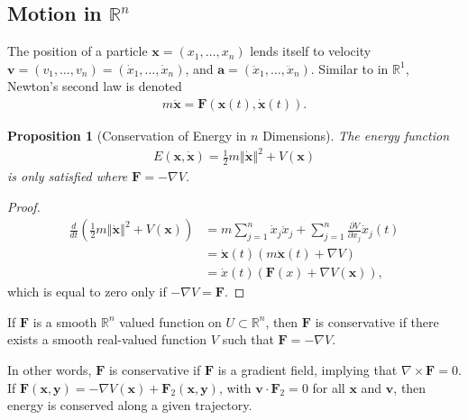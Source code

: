 \documentclass[12pt]{extarticle}
\newcommand{\R}{\mathbb{R}}
\newcommand{\norm}[1]{\left\Vert #1\right\Vert}
\theoremstyle{plain}
\newtheorem*{proposition}{Proposition}%
\theoremstyle{definition}
\theoremstyle{remark}
\renewcommand{\newline}{\hfill\break}
\begin{document}
  \subsection{Motion in $\R^n$}%
  The position of a particle $\mathbf{x} = (x_1,\dots,x_n)$ lends itself to velocity $\mathbf{v} = (v_1,\dots,v_n) = (\dot{x}_1,\dots,\dot{x}_n)$, and $\mathbf{a} = (\ddot{x}_1,\dots,\ddot{x}_n)$. Similar to in $\R^1$, Newton's second law is denoted
  \begin{align*}
    m\mathbf{\ddot{x}} = \mathbf{F}(\mathbf{x}(t),\mathbf{\dot{x}}(t)).
  \end{align*}
  \begin{proposition}[Conservation of Energy in $n$ Dimensions]
    The energy function
    \begin{align*}
      E(\mathbf{x},\mathbf{\dot{x}}) = \frac{1}{2}m\norm{\mathbf{\dot{x}}}^2 + V(\mathbf{x})
    \end{align*}
    is only satisfied where $\mathbf{F} = -\nabla V$.
  \end{proposition}
  \begin{proof}
      \begin{align*}
        \frac{d}{dt}\left(\frac{1}{2}m\norm{\mathbf{\dot{x}}}^2 + V(\mathbf{x})\right) &= m\sum_{j=1}^{n}\dot{x}_j\ddot{x}_j + \sum_{j=1}^{n}\frac{\partial V}{\partial x_j}\dot{x}_j(t)\\
                                                                                 &= \mathbf{\dot{x}}(t)\left(m\mathbf{\ddot{x}}(t) + \nabla V\right)\\
                                                                                 &= \dot{x}(t)\left(\mathbf{F}(x) + \nabla V(\mathbf{x})\right),
      \end{align*}
      which is equal to zero only if $-\nabla V = \mathbf{F}$.
  \end{proof}
  If $\mathbf{F}$ is a smooth $\R^n$ valued function on $U\subset \R^n$, then $\mathbf{F}$ is conservative if there exists a smooth real-valued function $V$ such that $\mathbf{F} = -\nabla V$.\newline

  In other words, $\mathbf{F}$ is conservative if $\mathbf{F}$ is a gradient field, implying that $\nabla \times \mathbf{F} = 0$.\\

  If $\mathbf{F}(\mathbf{x},\mathbf{y}) = -\nabla V(\mathbf{x}) + \mathbf{F}_{2}(\mathbf{x},\mathbf{y})$, with $\mathbf{v}\cdot \mathbf{F}_{2} = 0$ for all $\mathbf{x}$ and $\mathbf{v}$, then energy is conserved along a given trajectory.
\end{document}

